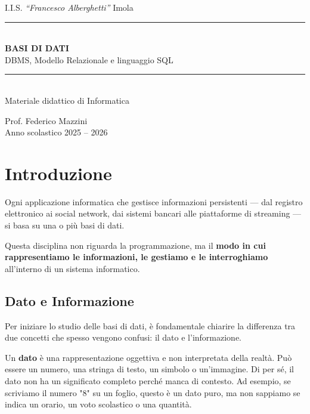 \documentclass[a4paper,12pt]{article}
\begin{document}
\begin{titlepage}
\centering

{\Large I.I.S. \textit{``Francesco Alberghetti''} Imola}\\[3cm]

\rule{0.85\textwidth}{0.8pt}\\[0.9cm]

{\huge\bfseries BASI DI DATI}\\[0.4cm]
{\Large DBMS, Modello Relazionale e linguaggio SQL}\\[0.6cm]

\rule{0.85\textwidth}{0.8pt}\\[2.5cm]

{\Large Materiale didattico di Informatica}\\[0.3cm]



\vfill

{\large Prof. Federico Mazzini}\\[0.3cm]
{\large Anno scolastico 2025 -- 2026}

\end{titlepage}

\newpage
\tableofcontents
\newpage

\section{Introduzione}
Ogni applicazione informatica che gestisce informazioni persistenti --- dal registro elettronico ai social network, dai sistemi bancari alle piattaforme di streaming --- si basa su una o più basi di dati.

Questa disciplina non riguarda la programmazione, ma il \textbf{modo in cui rappresentiamo le informazioni, le gestiamo e le interroghiamo} all’interno di un sistema informatico.
\subsection{Dato e Informazione}

Per iniziare lo studio delle basi di dati, è fondamentale chiarire la differenza tra due concetti che spesso vengono confusi: il dato e l'informazione.

Un \textbf{dato} è una rappresentazione oggettiva e non interpretata della realtà. Può essere un numero, una stringa di testo, un simbolo o un'immagine. Di per sé, il dato non ha un significato completo perché manca di contesto. Ad esempio, se scriviamo il numero "8" su un foglio, questo è un dato puro, ma non sappiamo se indica un orario, un voto scolastico o una quantità.
\end{document}
